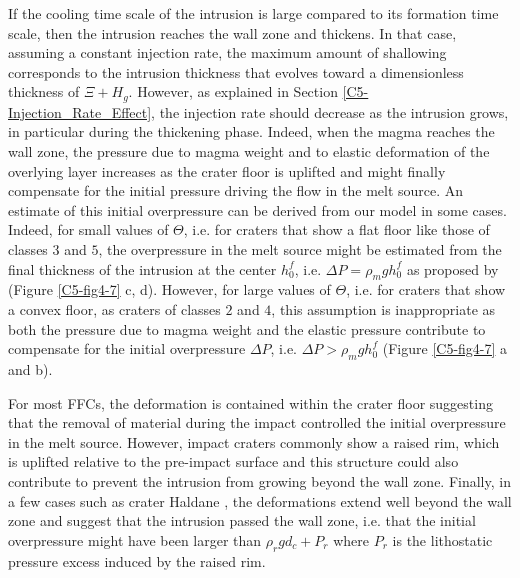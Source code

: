 If the  cooling time scale of  the intrusion is large  compared to its
formation time  scale, then  the intrusion reaches  the wall  zone and
thickens.   In that  case,  assuming a  constant  injection rate,  the
maximum amount  of shallowing  corresponds to the  intrusion thickness
that  evolves  toward  a  dimensionless  thickness  of  $\Xi  +  H_g$.
However,   as  explained   in  Section   \ref{C5-Injection_Rate_Effect},  the
injection rate should  decrease as the intrusion  grows, in particular
during the thickening phase.  Indeed,  when the magma reaches the wall
zone, the pressure  due to magma weight and to  elastic deformation of
the  overlying layer  increases as  the crater  floor is  uplifted and
might finally compensate for the  initial pressure driving the flow in
the  melt source.   An estimate  of this  initial overpressure  can be
derived from  our model in  some cases.   Indeed, for small  values of
$\Theta$,  i.e. for  craters  that show  a flat  floor  like those  of
classes $3$  and $5$,  the overpressure  in the  melt source  might be
estimated  from the  final thickness  of the  intrusion at  the center
$h_0^f$,   i.e.    $\Delta    P=\rho_{m}gh_{0}^f$   as   proposed   by
\citet{Jozwiak:2012dq}  (Figure \ref{C5-fig4-7}  c,  d). However,  for
large values of $\Theta$, i.e.  for  craters that show a convex floor,
as craters of classes $2$ and $4$, this assumption is inappropriate as
both  the  pressure due  to  magma  weight  and the  elastic  pressure
contribute to compensate for the initial overpressure $\Delta P$, i.e.
$\Delta P> \rho_m gh_0^f$ (Figure \ref{C5-fig4-7} a and b).
	
For most  FFCs, the deformation  is contained within the  crater floor
\citep{Schultz:1976kt} suggesting that the  removal of material during
the impact  controlled the  initial overpressure  in the  melt source.
However, impact craters commonly show  a raised rim, which is uplifted
relative  to the  pre-impact  surface and  this  structure could  also
contribute to prevent the intrusion from growing beyond the wall zone.
Finally, in a few cases such as crater Haldane \citep{Schultz:1976kt},
the deformations extend well beyond the wall zone and suggest that the
intrusion passed  the wall zone,  i.e.  that the  initial overpressure
might have  been larger than  $\rho_r g d_c  +P_r$ where $P_r$  is the
lithostatic pressure excess induced by the raised rim.
		
